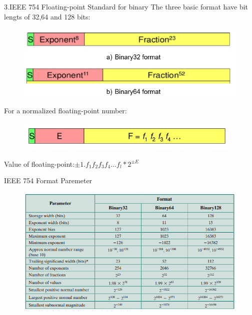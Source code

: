 \documentclass[11pt]{beamer}
\begin{document}
\begin{frame}[t]{3.IEEE 754 Floating-point Standard for binary}
The three basic format have bit lengts of 32,64 and 128 bits:
\begin{center}
    \begin{figure}[htp]
    \begin{center}
     \includegraphics[scale=.5]{image/fig20}
    \end{center}
    \label{reffig20}
    \end{figure}
\end{center}

For a normalized floating-point number:
\begin{center}
    \begin{figure}[htp]
    \begin{center}
     \includegraphics[scale=.7]{image/fig24}
    \end{center}
    \label{reffig24}
    \end{figure}
\end{center}
Value of floating-point:$\pm{1.f_1f_2f_3f_4...f_l}*2^{\pm{E}}$\\
\end{frame}
\begin{frame}[t]{IEEE 754 Format Paremeter}
\begin{center}
    \begin{figure}[htp]
    \begin{center}
     \includegraphics[scale=.5]{image/fig4}
    \end{center}
    \label{reffig4}
    \end{figure}
\end{center}
\end{frame}
\end{document}
